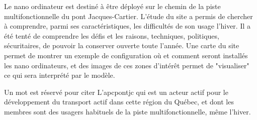 ﻿\par Le nano ordinateur est destiné à être déployé sur le chemin de la piste multifonctionnelle du pont Jacques-Cartier. L'étude du site a permis de chercher à comprendre, parmi ses caractéristiques, les difficultés de son usage l'hiver. Il a été tenté de comprendre les défis et les raisons, techniques, politiques, sécuritaires, de pouvoir la conserver ouverte toute l'année. Une carte du site permet de montrer un exemple de configuration où et comment seront installés les nano ordinateurs, et des images de ces  zones d'intérêt permet de "visualiser" ce qui sera interprété par le modèle. 
\par Un mot est réservé pour citer L'\acrlong{apcpontjc} qui est un acteur actif pour le développement du transport actif dans cette région du Québec, et dont les membres sont des usagers habituels de la piste multifonctionnelle, même l'hiver.